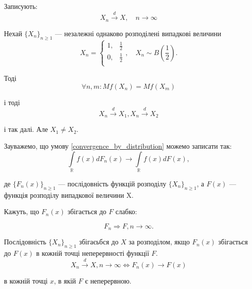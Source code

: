 Записують:
$$X_n \xrightarrow{d} X, \quad n \rightarrow \infty$$

\begin{example}
    Нехай $\{X_n\}_{n \geqslant 1}$ --- незалежні однаково
    розподілені випадкові величини
    $$X_n = \left\{ \begin{array}{ll}
        1, & \frac{1}{2} \\
        0, & \frac{1}{2} \\
    \end{array} \right., \quad X_n \sim B(\frac{1}{2}).$$
    
    Тоді
    $$\forall n, m: Mf(X_n) = Mf(X_m)$$
    
    і  тоді
    $$X_n \xrightarrow{d} X_1, X_n \xrightarrow{d} X_2$$
    
    і так далі. Але $X_1 \neq X_2$.
\end{example}

Зауважемо, що умову \ref{convergence_by_distribution}
можемо записати так:
\begin{equation}
    \int\limits_{\mathbb{R}} f(x) dF_n(x) \rightarrow
    \int\limits_{\mathbb{R}} f(x) dF(x),
\end{equation}

де $\{F_n(x)\}_{n \geqslant 1}$ --- послідовність функцій
розподілу $\{X_n\}_{n \geqslant 1}$, а
$F(x)$ --- функція розподілу випадкової величини X.

Кажуть, що $F_n(x)$ збігається до $F$ слабко:

\begin{equation}
    F_n \Rightarrow F, n \rightarrow \infty. 
\end{equation}

\begin{definition}
    Послідовність $\{X_n\}_{n \geqslant 1}$ збігаєьбся
    до $X$ за розподілом, якщо $F_n(x)$ збігається
    до $F(x)$ в кожній точці неперервності функції $F$.
    $$X_n \xrightarrow{d} X, n \rightarrow \infty \Leftrightarrow F_n(x) \rightarrow F(x)$$
    
    в кожній точці $x$, в якій $F$ є неперервною.
\end{definition}

